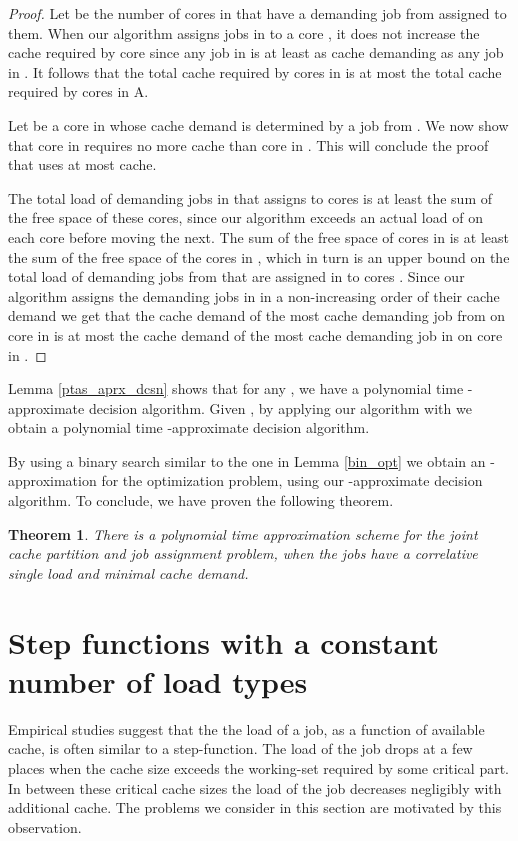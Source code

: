 \documentclass[11pt]{article}
\newtheorem{theorem}{Theorem}[section]
\begin{document}
\begin{proof}
Let  be the number of cores in  that have a demanding job from  assigned to them.
When our algorithm assigns jobs in  to a core ,  it does not increase the cache required by core  since any job in  is at least as cache demanding as any job in .
It follows that the total cache required by cores  in  is at most the total cache required by cores  in A. 

Let  be a core in   whose cache demand is determined by a job from .
We now show that core  in  requires no more cache than core  in . This will conclude the proof that  uses at most  cache. 

The total load of demanding jobs in  that  assigns to cores  is at least the sum of the free space of these cores, since our algorithm exceeds an actual load of  on each core before moving the next. The sum of the free space of cores  in  is at least the sum of the free space of the cores  in , which in turn is an upper bound on the total load of demanding jobs from  that are assigned in  to cores .
Since our algorithm assigns the demanding jobs in  in a non-increasing order of their cache demand we get that the cache demand of the most cache demanding job from  on core  in  is at most the cache demand of the most cache demanding job in  on core  in . 
\end{proof}

Lemma \ref{ptas_aprx_dcsn} shows that for any , we have a polynomial time -approximate decision algorithm.
Given , by applying our algorithm with  we obtain a polynomial time -approximate decision algorithm.

By using a binary search similar to the one in Lemma \ref{bin_opt} we obtain an -approximation for the optimization problem, using our -approximate decision algorithm.
To conclude, we have proven the following theorem.

\begin{theorem}
There is a polynomial time approximation scheme for the joint cache partition and job assignment problem, when the jobs have a correlative single load and minimal cache demand.
\end{theorem}

\section{Step functions with a constant number of load types}\label{sec_const}

Empirical studies \cite{Drepper} suggest that the the load of a job, as a function of available cache, is often similar to a step-function.
The load of the job drops at a few places when the cache size exceeds the working-set required by some critical part.
In between these critical cache sizes the load of the job decreases negligibly with additional cache. The problems we consider in this section are motivated by this observation.
\end{document}
